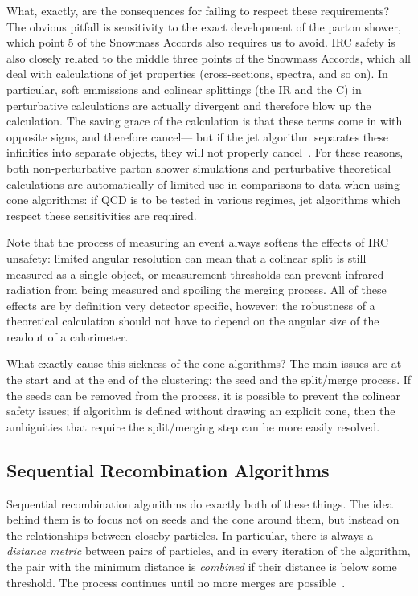 What, exactly, are the consequences for failing to respect these requirements? The obvious pitfall is sensitivity to the exact development of the parton shower, which point 5 of the Snowmass Accords also requires us to avoid. IRC safety is also closely related to the middle three points of the Snowmass Accords, which all deal with calculations of jet properties (cross-sections, \pt spectra, and so on). In particular, soft emmissions and colinear splittings (the IR and the C) in perturbative calculations are actually divergent and therefore blow up the calculation. The saving grace of the calculation is that these terms come in with opposite signs, and therefore cancel--- but if the jet algorithm separates these infinities into separate objects, they will not properly cancel~\cite{Jetography}. For these reasons, both non-perturbative parton shower simulations and perturbative theoretical calculations are automatically of limited use in comparisons to data when using cone algorithms: if QCD is to be tested in various regimes, jet algorithms which respect these sensitivities are required.

Note that the process of measuring an event always softens the effects of IRC unsafety: limited angular resolution can mean that a colinear split is still measured as a single object, or measurement thresholds can prevent infrared radiation from being measured and spoiling the merging process. All of these effects are by definition very detector specific, however: the robustness of a theoretical calculation should not have to depend on the angular size of the readout of a calorimeter.

What exactly cause this sickness of the cone algorithms? The main issues are at the start and at the end of the clustering: the seed and the split/merge process. If the seeds can be removed from the process, it is possible to prevent the colinear safety issues; if algorithm is defined without drawing an explicit cone, then the ambiguities that require the split/merging step can be more easily resolved.

\subsection{Sequential Recombination Algorithms}
\label{chapter:jets-and-substructure:sequential}


Sequential recombination algorithms do exactly both of these things. The idea behind them is to focus not on seeds and the cone around them, but instead on the relationships between closeby particles. In particular, there is always a \textit{distance metric} between pairs of particles, and in every iteration of the algorithm, the pair with the minimum distance is \textit{combined} if their distance is below some threshold. The process continues until no more merges are possible~\cite{Jetography}.

